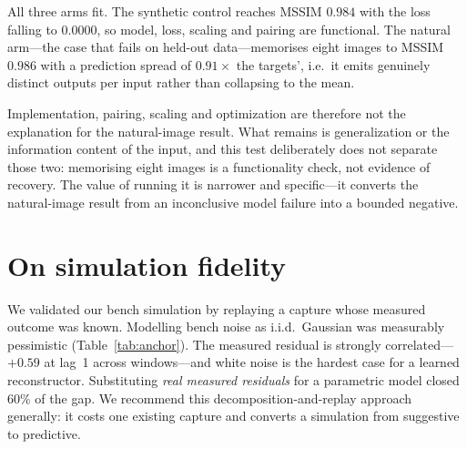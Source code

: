 \documentclass[10pt,conference]{article}
\begin{document}
\begin{table}[t]\centering\small
\caption{Tiny-subset functionality check. \textsc{Synthetic} features are a fixed random
linear projection of the image itself, so the mapping is learnable by construction and a
working pipeline must fit it. Spread ratio is the across-sample standard deviation of the
predictions divided by that of the targets: a model collapsed to the dataset mean scores
near zero here while still showing a falling loss.}
\label{tab:overfit}

\end{table}

All three arms fit. The synthetic control reaches MSSIM $0.984$ with the loss falling to
$0.0000$, so model, loss, scaling and pairing are functional. The natural arm---the case
that fails on held-out data---memorises eight images to MSSIM $0.986$ with a prediction
spread of $0.91\times$ the targets', i.e.\ it emits genuinely distinct outputs per input
rather than collapsing to the mean.

Implementation, pairing, scaling and optimization are therefore not the explanation for
the natural-image result. What remains is generalization or the information content of
the input, and this test deliberately does not separate those two: memorising eight
images is a functionality check, not evidence of recovery. The value of running it is
narrower and specific---it converts the natural-image result from an inconclusive model
failure into a bounded negative.

\section{On simulation fidelity}

\begin{table}[t]\centering\small
\caption{Simulation replaying a capture whose outcome is known.}
\label{tab:anchor}

\end{table}

We validated our bench simulation by replaying a capture whose measured outcome was
known. Modelling bench noise as i.i.d.\ Gaussian was measurably pessimistic
(Table~\ref{tab:anchor}). The measured residual is strongly correlated---$+0.59$ at
lag~1 across windows---and white noise is the hardest case for a learned reconstructor.
Substituting \emph{real measured residuals} for a parametric model closed 60\% of the
gap. We recommend this decomposition-and-replay approach generally: it costs one existing
capture and converts a simulation from suggestive to predictive.
\end{document}
